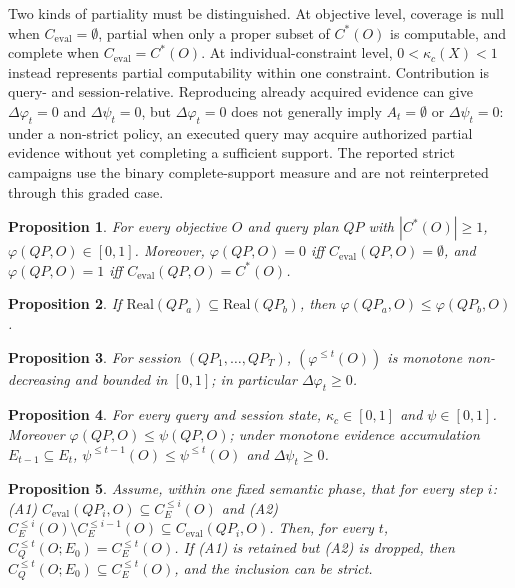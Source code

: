 \documentclass[journal]{IEEEtran}
\newtheorem{proposition}{Proposition}
\begin{document}
Two kinds of partiality must be distinguished. At objective level, coverage is null when $C_{\mathrm{eval}}=\emptyset$, partial when only a proper subset of $C^*(O)$ is computable, and complete when $C_{\mathrm{eval}}=C^*(O)$. At individual-constraint level, $0<\kappa_c(X)<1$ instead represents partial computability within one constraint. Contribution is query- and session-relative. Reproducing already acquired evidence can give $\Delta\varphi_t=0$ and $\Delta\psi_t=0$, but $\Delta\varphi_t=0$ does not generally imply $A_t=\emptyset$ or $\Delta\psi_t=0$: under a non-strict policy, an executed query may acquire authorized partial evidence without yet completing a sufficient support. The reported strict campaigns use the binary complete-support measure and are not reinterpreted through this graded case.

\begin{proposition}
\label{prop:borne}
For every objective $O$ and query plan $QP$ with $|C^*(O)|\ge1$, $\varphi(QP,O)\in[0,1]$. Moreover, $\varphi(QP,O)=0$ iff $C_{\mathrm{eval}}(QP,O)=\emptyset$, and $\varphi(QP,O)=1$ iff $C_{\mathrm{eval}}(QP,O)=C^*(O)$.
\end{proposition}

\begin{proposition}
\label{prop:mono-real}
If $\mathrm{Real}(QP_a)\subseteq\mathrm{Real}(QP_b)$, then $\varphi(QP_a,O)\le\varphi(QP_b,O)$.
\end{proposition}

\begin{proposition}
\label{prop:session}
For session $(QP_1,\dots,QP_T)$, $(\varphi^{\le t}(O))$ is monotone non-decreasing and bounded in $[0,1]$; in particular $\Delta\varphi_t\ge0$.
\end{proposition}

\begin{proposition}
\label{prop:graded}
For every query and session state, $\kappa_c\in[0,1]$ and $\psi\in[0,1]$. Moreover $\varphi(QP,O)\le\psi(QP,O)$; under monotone evidence accumulation $E_{t-1}\subseteq E_t$, $\psi^{\le t-1}(O)\le\psi^{\le t}(O)$ and $\Delta\psi_t\ge0$.
\end{proposition}

\begin{proposition}
\label{prop:session-equivalence}
Assume, within one fixed semantic phase, that for every step $i$: (A1) $C_{\mathrm{eval}}(QP_i,O)\subseteq C_E^{\le i}(O)$ and (A2) $C_E^{\le i}(O)\setminus C_E^{\le i-1}(O)\subseteq C_{\mathrm{eval}}(QP_i,O)$. Then, for every $t$, $C_Q^{\le t}(O;E_0)=C_E^{\le t}(O)$. If (A1) is retained but (A2) is dropped, then $C_Q^{\le t}(O;E_0)\subseteq C_E^{\le t}(O)$, and the inclusion can be strict.
\end{proposition}
\end{document}
